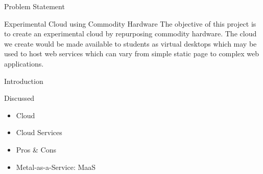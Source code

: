 \begin{frame}{Problem Statement}
    \begin{block}{Experimental Cloud using Commodity Hardware}
        The objective of this project is to create an experimental cloud by repurposing commodity hardware. The cloud we create would be made available to students as virtual desktops which may be used to host web services which can vary from simple static page to complex web applications.
    \end{block}
\end{frame}

\begin{frame}{Introduction}
    \begin{block}{Discussed}
        \begin{itemize}
            \item Cloud
            \item Cloud Services
            \item Pros \& Cons
            \item Metal-as-a-Service: MaaS
        \end{itemize}
    \end{block}
\end{frame}





